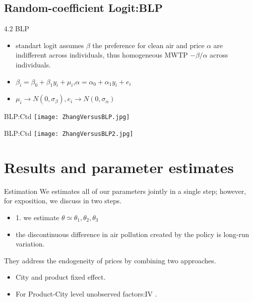 \documentclass[10pt]{beamer}
\begin{document}
\subsection{Random-coefficient Logit:BLP}
\begin{frame}{4.2 BLP}
    \begin{itemize}
          \item     standart logit assumes $\beta$ the preference for clean air and price $\alpha$ are indifferent across individuals, thus homogeneous MWTP $-\beta/\alpha$ across individuals.
          \item $\beta_i = \beta_0+\beta_1 y_i +\mu_i$,$\alpha = \alpha_0 +\alpha_{1}y_i+e_i$
          \item $\mu_i\rightarrow N(0,\sigma_\beta),e_i\rightarrow N(0,\sigma_\alpha)$
      \end{itemize}
\end{frame}
\begin{frame}{BLP:Ctd}
    \texttt{[image: ZhangVersusBLP.jpg]}
\end{frame}
\begin{frame}{BLP:Ctd}
    \texttt{[image: ZhangVersusBLP2.jpg]}
\end{frame}
\section{Results and parameter estimates}
\begin{frame}{Estimation}
	We estimates all of our parameters jointly in a single step; however, for exposition, we discuss in two steps.
	\begin{itemize}
		\item 1. we estimate $\theta \simeq {\theta_1,\theta_2,\theta_3}$
		\item the discontinuous difference in air pollution created by the policy is long-run variation.
	\end{itemize}
	They address the endogeneity of prices by combining two approaches.
	\begin{itemize}
	    \item City and product fixed effect.
	    \item For Product-City level unobserved factors:IV .
	\end{itemize}
\end{frame}
\end{document}
